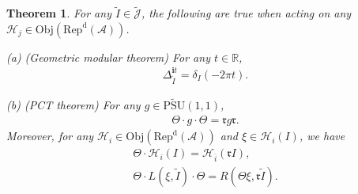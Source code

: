 \documentclass[12pt,a4paper]{article}
\theoremstyle{definition}
\theoremstyle{plain}
\newtheorem{thm}[df]{Theorem}
\newcommand{\fk}{\mathfrak}
\newcommand{\mc}{\mathcal}
\newcommand{\wtd}{\widetilde}
\newcommand{\ovl}{\overline}
\newcommand{\UPSU}{\widetilde{\mathrm{PSU}}(1,1)}
\newcommand{\Jtd}{\widetilde{\mathcal J}}
\newcommand{\im}{\mathbf{i}}
\newcommand{\RepdA}{\mathrm{Rep}^{\mathrm d}(\mc A)}
\newcommand{\Obj}{\mathrm{Obj}}
\numberwithin{equation}{section}
\begin{document}
\begin{thm}\label{lb26}
For any $\wtd I\in\Jtd$, the following are true when acting on any $\mc H_j\in\Obj(\RepdA)$.

(a) (Geometric modular theorem) For any $t\in\mathbb R$,
\begin{align}
\Delta_{\wtd I}^{\im t}=\delta_I(-2\pi t).\label{eq29}
\end{align}

(b) (PCT theorem) For any $g\in\UPSU$,
\begin{gather}
\Theta \cdot g \cdot\Theta=\fk r g\fk r.\label{eq30}
\end{gather}
Moreover, for any $\mc H_i\in\Obj(\RepdA)$ and $\xi\in\mc H_i(I)$, we have
\begin{gather}
\Theta\cdot\mc H_i(I)=\mc H_{\ovl i}(\fk r I),\label{eq34}\\
\Theta \cdot L(\xi,\wtd I) \cdot \Theta=R(\Theta\xi,\fk r\wtd I).\label{eq35}
\end{gather}
\end{thm}
\end{document}
